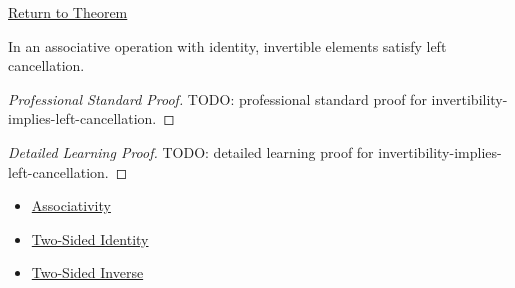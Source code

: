 \newpage
{}
\label{prf:invertibility-implies-left-cancellation}

\begin{remark*}[Return]
\hyperref[prop:invertibility-implies-left-cancellation]{Return to Theorem}
\end{remark*}

\begin{proposition*}
In an associative operation with identity, invertible elements satisfy left
cancellation.
\end{proposition*}

\begin{proof}[Professional Standard Proof]
\LRAProofBodyStart
TODO: professional standard proof for invertibility-implies-left-cancellation.
\end{proof}

\begin{proof}[Detailed Learning Proof]
\LRAProofBodyStart
TODO: detailed learning proof for invertibility-implies-left-cancellation.
\end{proof}

\begin{remark*}
\end{remark*}

\begin{dependencies}
\begin{itemize}
  \item \hyperref[def:associativity]{Associativity}
  \item \hyperref[def:two-sided-identity]{Two-Sided Identity}
  \item \hyperref[def:two-sided-inverse]{Two-Sided Inverse}
\end{itemize}
\end{dependencies}

\clearpage

